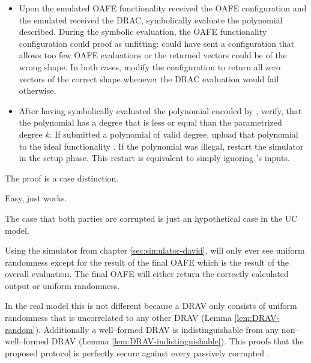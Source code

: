 \begin{itemize}

  \item Upon the emulated OAFE functionality received the OAFE configuration and
    the emulated \JWpTwo{} received the DRAC, symbolically evaluate the
    polynomial \JWpOne{} described. During the symbolic evaluation, the OAFE
    functionality configuration could proof as unfitting: \JWpOne{} could have
    sent a configuration that allows too few OAFE evaluations or the returned
    vectors could be of the wrong shape. In both cases, modify the configuration
    to return all zero vectors of the correct shape whenever the DRAC evaluation
    would fail otherwise.
  \item After having symbolically evaluated the polynomial encoded by \JWpOne{},
    verify, that the polynomial has a degree that is less or equal than the
    parametrized degree $k$. If \JWpOne{} submitted a polynomial of valid
    degree, upload that polynomial to the ideal functionality \JWfuncSymOPE{}.
    If the polynomial was illegal, restart the simulator in the setup phase.
    This restart is equivalent to simply ignoring \JWpOne{}'s inputs.

\end{itemize}


%
%
\label{sec:proof}

The proof is a case distinction.



Easy, just works.




The case that both parties are corrupted is just an hypothetical case in the UC
model.



Using the simulator from chapter \ref{sec:simulator-david}, \JWpTwo{} will only
ever see uniform randomness except for the result of the final OAFE which is the
result of the overall evaluation. The final OAFE will either
return the correctly calculated output or uniform randomness.

In the real model this is not different because a DRAV only consists of uniform
randomness that is uncorrelated to any other DRAV (Lemma \ref{lem:DRAV-random}).
Additionally a well--formed DRAV is indistinguishable from any non--well--formed
DRAV (Lemma \ref{lem:DRAV-indistinguishable}). This proofs that the proposed
protocol is perfectly secure against every passively corrupted \JWpTwo{}.

